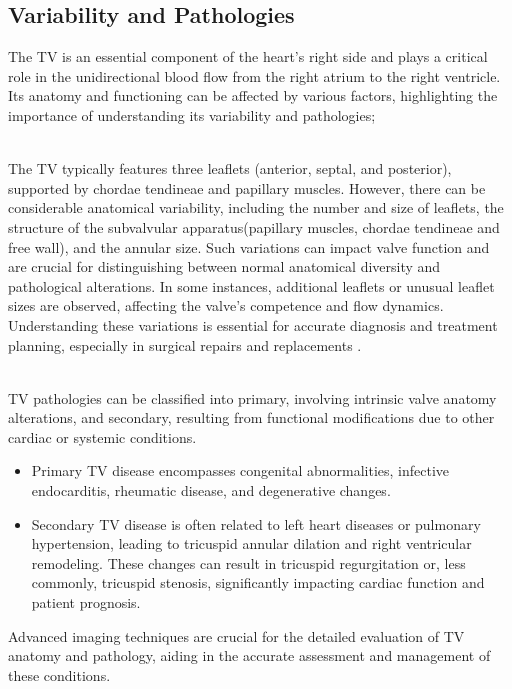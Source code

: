 \subsection{Variability and Pathologies}
The \gls{TV} is an essential component of the heart's right side and plays a critical role in the unidirectional blood flow from the right atrium to the right ventricle. Its anatomy and functioning can be affected by various factors, highlighting the importance of understanding its variability and pathologies;

\\
The \gls{TV} typically features three leaflets (anterior, septal, and posterior), supported by chordae tendineae and papillary muscles. However, there can be considerable anatomical variability, including the number and size of leaflets, the structure of the subvalvular apparatus(papillary muscles, chordae tendineae and free wall), and the annular size. Such variations can impact valve function and are crucial for distinguishing between normal anatomical diversity and pathological alterations. In some instances, additional leaflets or unusual leaflet sizes are observed, affecting the valve's competence and flow dynamics. Understanding these variations is essential for accurate diagnosis and treatment planning, especially in surgical repairs and replacements .~

\\
\gls{TV} pathologies can be classified into primary, involving intrinsic valve anatomy alterations, and secondary, resulting from functional modifications due to other cardiac or systemic conditions.
\begin{itemize}
    \item Primary \gls{TV} disease encompasses congenital abnormalities, infective endocarditis, rheumatic disease, and degenerative changes.
    \item Secondary \gls{TV} disease is often related to left heart diseases or pulmonary hypertension, leading to tricuspid annular dilation and right ventricular remodeling. These changes can result in tricuspid regurgitation or, less commonly, tricuspid stenosis, significantly impacting cardiac function and patient prognosis.
\end{itemize}
Advanced imaging techniques are crucial for the detailed evaluation of \gls{TV} anatomy and pathology, aiding in the accurate assessment and management of these conditions.~

